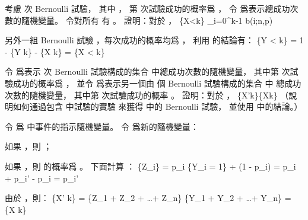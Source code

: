 \startEXERCISE
考慮  次 Bernoulli 試驗，
其中 ，
第  次試驗成功的概率爲 ，
令  爲表示總成功次數的隨機變量。
令對所有  有 。
證明：對於 ，
\startformula
\Pr\{X<k\} \ge \sum_{i=0}^{k-1} b(i;n,p)
\stopformula
\stopEXERCISE

\startANSWER
另外一組 Bernoulli 試驗 ，每次成功的概率均爲 ，
利用 的結論有：
\startformula
\Pr\{Y < k\} = 1 - \Pr\{Y \ge k\}  - \Pr\{X \ge k\} = \Pr\{X < k\}
\stopformula
\stopANSWER

\startEXERCISE[exercise:C.4-9]\DIFFICULT
令  爲表示  次 Bernoulli 試驗構成的集合  中總成功次數的隨機變量，
其中第  次試驗成功的概率爲 ，
並令  爲表示另一個由  個 Bernoulli 試驗構成的集合  中
總成功次數的隨機變量，
其中第  次試驗成功的概率 。
證明：對於 ，
\startformula
\Pr\{X'\ge k\}\ge \Pr\{X\ge k\}
\stopformula
（\hint 說明如何通過包含  中試驗的實驗
來獲得  中的 Bernoulli 試驗，
並使用 中的結論。）
\stopEXERCISE

\startANSWER
令  爲  中事件的指示隨機變量。
令  爲新的隨機變量：
\startigBase[a]
\item 如果 ，則 ；
\item 如果 ，則  的概率爲 。
\stopigBase
下面計算 ：
\startformula
\Pr\{Z_i\} = p_i \Pr\{Y_i = 1\} + (1 - p_i) \cdot {}
                = p_i + p_i' - p_i
                = p_i'
\stopformula

由於 ，則：
\startformula
\Pr\{X' \ge k\} = \Pr\{Z_1 + Z_2 + \ldots + Z_n\}
                \ge \Pr\{Y_1 + Y_2 + \ldots + Y_n\}
                = \Pr\{X \ge k\}
\stopformula
\stopANSWER

\stopsection
